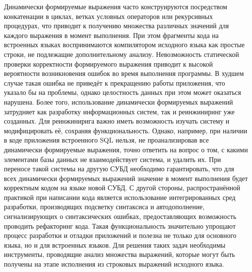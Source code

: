 Динамически формируемые выражения часто конструируются посредством конкатенации в циклах, ветках условных операторов или рекурсивных процедурах, что приводит к получению множества различных значений для каждого выражения в момент выполнения. При этом фрагменты кода на встроенных  языках воспринимаются компилятором исходного языка как простые строки, не подлежащие дополнительному анализу. Невозможность статической проверки корректности формируемого выражения приводит к высокой вероятности возникновения ошибок во время выполнения программы. В худшем случае такая ошибка не приведёт к прекращению работы приложения, что указало бы на проблемы, однако целостность данных при этом может оказаться нарушена. Более того, использование динамически формируемых выражений затрудняет как разработку информационных систем, так и реинжиниринг уже созданных. Для реинжинирига важно иметь возможность изучать систему и модифицировать её, сохраняя функциональность. Однако, например, при наличии в коде приложения встроенного SQL нельзя, не проанализировав все динамически формируемые выражения, точно ответить на вопрос о том, с какими элементами базы данных не взаимодействует система, и удалить их. При переносе такой системы на другую СУБД необходимо гарантировать, что для всех динамически формируемых выражений значение в момент выполнения будет корректным кодом на языке новой СУБД. С другой стороны, распространённой практикой при написании кода является использование интегрированных сред разработки, производящих подсветку синтаксиса и автодополнение, сигнализирующих о синтаксических ошибках, предоставляющих возможность проводить рефакторинг кода. Такая функциональность значительно упрощают процесс разработки и отладки приложений и полезна не только для основного языка, но и для встроенных языков. Для решения таких задач необходимы инструменты, проводящие анализ множества выражений, которые могут быть получены на этапе исполнения из строковых выражений исходного языка.


